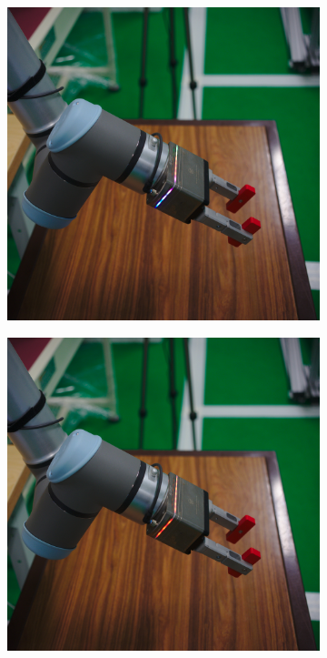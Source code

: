 \begin{figure}[h]
    \centering
    \begin{subfigure}{.2\linewidth}
      \centering
      \includegraphics[width=.95\linewidth]{figs/chp5/grip_rgb.jpg}
    \end{subfigure}%
    \begin{subfigure}{.2\linewidth}
      \centering
      \includegraphics[width=.95\linewidth]{figs/chp5/grip_red.jpg}

\end{subfigure}
\end{figure}
